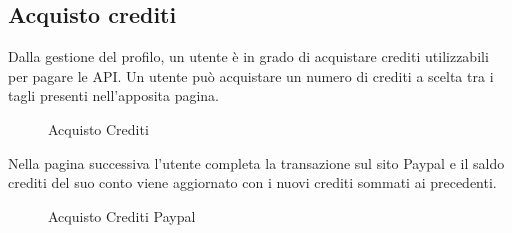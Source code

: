 \subsection{Acquisto crediti}
Dalla gestione del profilo, un utente è in grado di acquistare crediti utilizzabili per pagare le API. Un utente può acquistare un numero di crediti a scelta tra i tagli presenti nell'apposita pagina. 
\label{Acquisto Crediti}
\begin{figure}[H]
	\centering
	\caption{Acquisto Crediti}
\end{figure}

Nella pagina successiva l'utente completa la transazione sul sito Paypal e il saldo crediti del suo conto viene aggiornato con i nuovi crediti sommati ai precedenti.

\label{Acquisto Crediti Paypal}
\begin{figure}[H]
	\centering
	\caption{Acquisto Crediti Paypal}
\end{figure}

